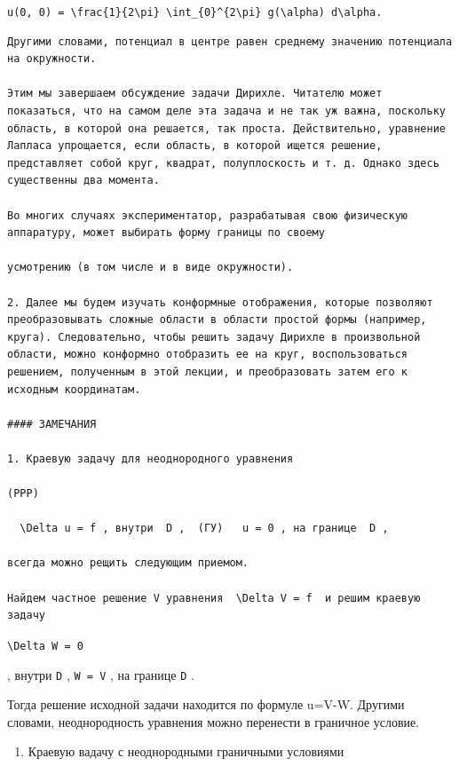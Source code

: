 \documentclass[
  ukrainian,
]{article}
\providecommand{\tightlist}{%
  \setlength{\itemsep}{0pt}\setlength{\parskip}{0pt}}
\begin{document}
\texttt{u(0,\ 0)\ =\ \textbackslash{}frac\{1\}\{2\textbackslash{}pi\}\ \textbackslash{}int\_\{0\}\^{}\{2\textbackslash{}pi\}\ g(\textbackslash{}alpha)\ d\textbackslash{}alpha.}

\begin{verbatim}
Другими словами, потенциал в центре равен среднему значению потенциала на окружности.

Этим мы завершаем обсуждение задачи Дирихле. Читателю может показаться, что на самом деле эта задача и не так уж важна, поскольку область, в которой она решается, так проста. Действительно, уравнение Лапласа упрощается, если область, в которой ищется решение, представляет собой круг, квадрат, полуплоскость и т. д. Однако здесь существенны два момента.

Во многих случаях экспериментатор, разрабатывая свою физическую аппаратуру, может выбирать форму границы по своему

усмотрению (в том числе и в виде окружности).

2. Далее мы будем изучать конформные отображения, которые позволяют преобразовывать сложные области в области простой формы (например, круга). Следовательно, чтобы решить задачу Дирихле в произвольной области, можно конформно отобразить ее на круг, воспользоваться решением, полученным в этой лекции, и преобразовать затем его к исходным координатам.

#### ЗАМЕЧАНИЯ

1. Краевую задачу для неоднородного уравнения

(PPP)

  \Delta u = f , внутри  D ,  (ГУ)   u = 0 , на границе  D ,

всегда можно рещить следующим приемом.

Найдем частное решение V уравнения  \Delta V = f  и решим краевую задачу
\end{verbatim}

\texttt{\textbackslash{}Delta\ W\ =\ 0}

, внутри \texttt{D} , \texttt{W\ =\ V} , на границе \texttt{D} .

Тогда решение исходной задачи находится по формуле u=V-W. Другими
словами, неоднородность уравнения можно перенести в граничное условие.

\begin{enumerate}
\def\labelenumi{\arabic{enumi}.}
\setcounter{enumi}{1}
\tightlist
\item
  Краевую вадачу с неоднородными граничными условиями
\end{enumerate}
\end{document}

